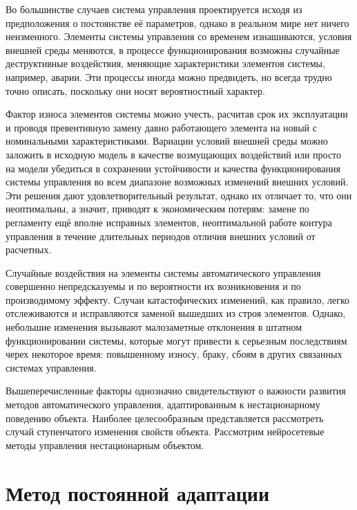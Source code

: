 
Во большинстве случаев система управления проектируется исходя из
предположения о постоянстве её параметров, однако в реальном мире нет
ничего неизменного.  Элементы системы управления со временем
изнашиваются, условия внешней среды меняются, в процессе
функционирования возможны случайные деструктивные воздействия,
меняющие характеристики элементов системы, например, аварии.  Эти
процессы иногда можно предвидеть, но всегда трудно точно описать,
поскольку они носят вероятностный характер.

Фактор износа элементов системы можно учесть, расчитав срок их
эксплуатации и проводя превентивную замену давно работающего элемента
на новый с номинальными характеристиками.  Вариации условий внешней
среды можно заложить в исходную модель в качестве возмущающих
воздействий или просто на модели убедиться в сохранении устойчивости и
качества функционирования системы управления во всем диапазоне
возможных изменений внешних условий.  Эти решения дают
удовлетворительный результат, однако их отличает то, что они
неоптимальны, а значит, приводят к экономическим потерям: замене по
регламенту ещё вполне исправных элементов, неоптимальной работе
контура управления в течение длительных периодов отличия внешних
условий от расчетных.

Случайные воздействия на элементы системы автоматического управления
совершенно непредсказуемы и по вероятности их возникновения и по
производимому эффекту.  Случаи катастофических изменений, как правило,
легко отслеживаются и исправляются заменой вышедших из строя
элементов.  Однако, небольшие изменения вызывают малозаметные
отклонения в штатном функционировании системы, которые могут привести
к серьезным последствиям черех некоторое время: повышенному износу,
браку, сбоям в других связанных системах управления.

Вышеперечисленные факторы однозначно свидетельствуют о важности
развития методов автоматического управления, адаптированным к
нестационарному поведению объекта.  Наиболее целесообразным
представляется рассмотреть случай ступенчатого изменения свойств
объекта.  Рассмотрим нейросетевые методы управления нестационарным
объектом.

\section{Метод постоянной адаптации}

